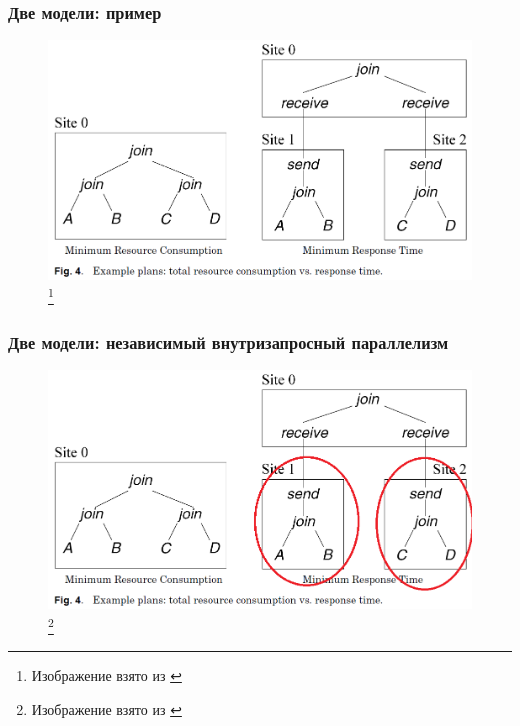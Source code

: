 \documentclass{beamer}
\begin{document}
\begin{frame}
\frametitle{Две модели: пример}

\begin{figure}[htb]
\includegraphics[width=\textwidth,height=0.80\textheight,keepaspectratio]{kossman-3.png} 
\footnote{\tiny{Изображение взято из \cite{Kossmann2000}}}
\end{figure}

\end{frame}

\begin{frame}
	\frametitle{Две модели: независимый внутризапросный параллелизм}
	
	\begin{figure}[htb]
		\includegraphics[width=\textwidth,height=0.80\textheight,keepaspectratio]{kossman-3a.png} 
		\footnote{\tiny{Изображение взято из \cite{Kossmann2000}}}
	\end{figure}
	
\end{frame}
\end{document}
